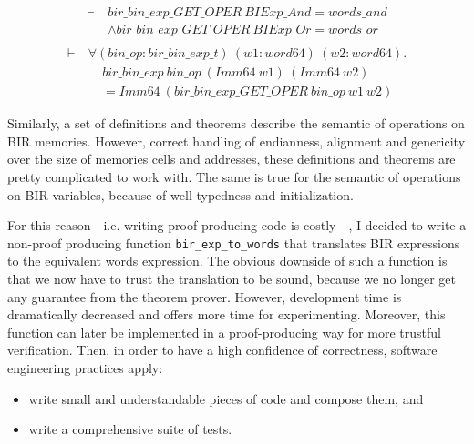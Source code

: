 \documentclass{kththesis}
\begin{document}
\begin{small}
    \begin{equation}
        \begin{split}
            \vdash~&bir\_bin\_exp\_GET\_OPER~BIExp\_And = words\_and\\
                   &\land bir\_bin\_exp\_GET\_OPER~BIExp\_Or = words\_or\\
        \end{split}
        \label{bir_bin_exp_GET_OPER_def}
    \end{equation}
    \begin{equation}
        \begin{split}
            \vdash~&\forall (bin\_op :bir\_bin\_exp\_t)~(w1 :word64)~(w2 :word64).\\
                   &~~~~~bir\_bin\_exp~bin\_op~(Imm64~w1)~(Imm64~w2)\\
                   &~~~~~= Imm64~(bir\_bin\_exp\_GET\_OPER~bin\_op~w1~w2)
        \end{split}
        \label{bir_bin_exp_def}
    \end{equation}
\end{small}

Similarly, a set of definitions and theorems describe the semantic of operations on BIR memories. However, correct handling of endianness, alignment and genericity over the size of memories cells and addresses, these definitions and theorems are pretty complicated to work with. The same is true for the semantic of operations on BIR variables, because of well-typedness and initialization.

For this reason---i.e. writing \gls{proof-producing} code is costly---, I decided to write a non-proof producing function \texttt{bir\_exp\_to\_words} that translates BIR expressions to the equivalent words expression. The obvious downside of such a function is that we now have to trust the translation to be sound, because we no longer get any guarantee from the theorem prover. However, development time is dramatically decreased and offers more time for experimenting. Moreover, this function can later be implemented in a proof-producing way for more trustful verification. Then, in order to have a high confidence of correctness, software engineering practices apply:

\begin{itemize}
    \item write small and understandable pieces of code and compose them, and
    \item write a comprehensive suite of tests.
\end{itemize}
\end{document}
